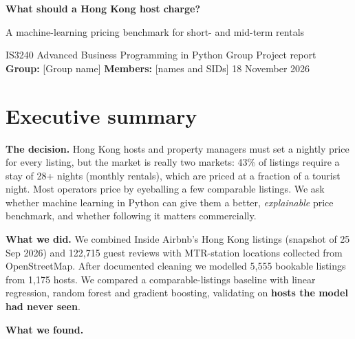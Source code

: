 \documentclass[10pt,a4paper]{article}
\begin{document}
{\fontsize{20}{24.0}\selectfont \color{blue} \raggedright \textbf{What should a Hong Kong host charge?}\par}\vspace{-4.5pt}
{\fontsize{13}{15.6}\selectfont \color{ink} \raggedright A machine-learning pricing benchmark for short- and mid-term rentals\par}\vspace{-2.5pt}
{\fontsize{8.5}{10.2}\selectfont \color{grey} \raggedright IS3240 Advanced Business Programming in Python \textperiodcentered{} Group Project report \textperiodcentered{} \textbf{Group:} [Group name] \textperiodcentered{} \textbf{Members:} [names and SIDs] \textperiodcentered{} 18 November 2026\par}\vspace{1.5pt}
\section*{Executive summary}
{\textbf{The decision.} Hong Kong hosts and property managers must set a nightly price for every listing, but the market is really two markets: 43\% of listings require a stay of 28+ nights (monthly rentals), which are priced at a fraction of a tourist night. Most operators price by eyeballing a few comparable listings. We ask whether machine learning in Python can give them a better, \textit{explainable} price benchmark, and whether following it matters commercially.\par}
{\textbf{What we did.} We combined Inside Airbnb's Hong Kong listings (snapshot of 25 Sep 2026) and 122,715 guest reviews with MTR-station locations collected from OpenStreetMap. After documented cleaning we modelled 5,555 bookable listings from 1,175 hosts. We compared a comparable-listings baseline with linear regression, random forest and gradient boosting, validating on \textbf{hosts the model had never seen}.\par}
{\raggedright \textbf{What we found.}\par}\vspace{-3.5pt}\nopagebreak[4]
\end{document}
